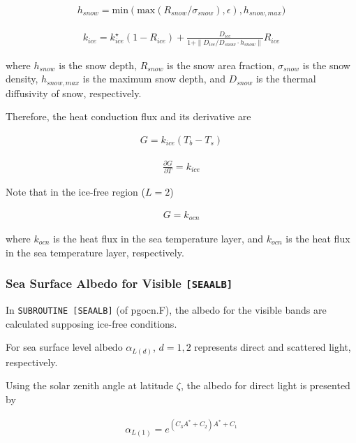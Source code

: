 \begin{eqnarray}
h_{snow} = \mathrm{min}(
    \mathrm{max}(
    R_{snow}/\sigma_{snow}),\epsilon
        ),h_{snow,max}
        )
\end{eqnarray}

\begin{eqnarray}      
k_{ice} = k_{ice}^\star (1-R_{ice}) + \frac{D_{ice}}{1+\| D_{ice}/D_{snow} \cdot h_{snow} \|} R_{ice}
\end{eqnarray}

where \(h_{snow}\) is the snow depth, \(R_{snow}\) is the snow area
fraction, \(\sigma_{snow}\) is the snow density, \(h_{snow,max}\) is the
maximum snow depth, and \(D_{snow}\) is the thermal diffusivity of snow,
respectively.

Therefore, the heat conduction flux and its derivative are

\begin{eqnarray}
 G = k_{ice} (T_b - T_s)
\end{eqnarray}

\begin{eqnarray}
 \frac{\partial G}{\partial T} = k_{ice}
\end{eqnarray}

Note that in the ice-free region (\(L=2\))

\begin{eqnarray}
G=k_{ocn}
\end{eqnarray}

where \(k_{ocn}\) is the heat flux in the sea temperature layer, and
\(k_{ocn}\) is the heat flux in the sea temperature layer, respectively.

\hypertarget{sea-surface-albedo-for-visible-seaalb}{%
\subsubsection{\texorpdfstring{Sea Surface Albedo for Visible
\texttt{{[}SEAALB{]}}}{Sea Surface Albedo for Visible {[}SEAALB{]}}}\label{sea-surface-albedo-for-visible-seaalb}}

In \texttt{SUBROUTINE\ {[}SEAALB{]}} (of pgocn.F), the albedo for the
visible bands are calculated supposing ice-free conditions.

For sea surface level albedo \(\alpha_{L(d)}\), \(d=1,2\) represents
direct and scattered light, respectively.

Using the solar zenith angle at latitude \(\zeta\), the albedo for
direct light is presented by

\begin{eqnarray}
    \alpha_{L(1)} = e^{(C_3A^* + C_2) A^* +C_1}
\end{eqnarray}

